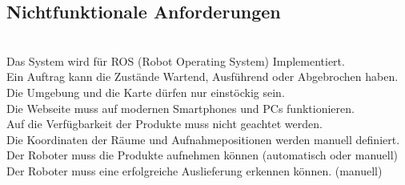 \subsection{Nichtfunktionale Anforderungen}\\
Das System wird für ROS (Robot Operating System) Implementiert.\\
Ein Auftrag kann die Zustände Wartend, Ausführend oder Abgebrochen haben.\\
Die Umgebung und die Karte dürfen nur einstöckig sein.\\
Die Webseite muss auf modernen Smartphones und PCs funktionieren.\\
Auf die Verfügbarkeit der Produkte muss nicht geachtet werden.\\
Die Koordinaten der Räume und Aufnahmepositionen werden manuell definiert.\\
Der Roboter muss die Produkte aufnehmen können (automatisch oder manuell)\\
Der Roboter muss eine erfolgreiche Auslieferung erkennen können. (manuell)\\



